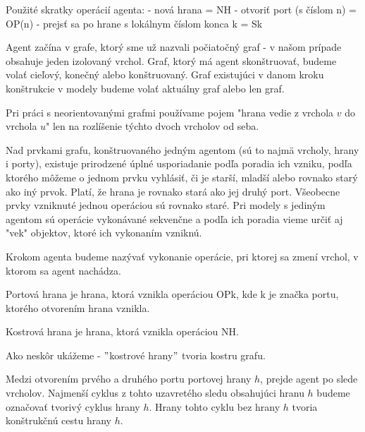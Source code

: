 \begin{ozn}
Použité skratky operácií agenta:
- nová hrana = NH
- otvoriť port (s číslom n) = OP(n)
- prejsť sa po hrane s lokálnym číslom konca k = Sk
\end{ozn}

\begin{ozn}
Agent začína v grafe, ktorý sme už nazvali počiatočný graf - v našom prípade
obsahuje jeden izolovaný vrchol. Graf, ktorý má agent skonštruovať, budeme
volať cieľový, konečný alebo konštruovaný. Graf existujúci v danom kroku
konštrukcie v modely budeme volať aktuálny graf alebo len graf.
\end{ozn}

\begin{pozn}
Pri práci s neorientovanými grafmi používame pojem "hrana vedie z vrchola
$v$
do vrchola $u$" len na rozlíšenie týchto dvoch vrcholov od seba.
\end{pozn}

\begin{ozn}
Nad prvkami grafu, konštruovaného jedným agentom
  (sú to najmä vrcholy, hrany i porty), existuje prirodzené úplné
usporiadanie podľa poradia ich vzniku, podľa ktorého môžeme o jednom prvku
vyhlásiť, či je starší, mladší alebo rovnako starý ako iný prvok. Platí, že
hrana je rovnako stará ako jej druhý port. Všeobecne prvky vzniknuté jednou
operáciou sú rovnako staré. Pri modely s jediným agentom sú operácie
vykonávané sekvenčne a podľa ich poradia vieme určiť aj "vek" objektov,
ktoré ich vykonaním vzniknú.
\end{ozn}

\begin{ozn}
Krokom agenta budeme nazývať vykonanie operácie, pri ktorej sa zmení vrchol,
v ktorom sa agent nachádza.
\end{ozn}

\begin{ozn}
Portová hrana je hrana, ktorá vznikla operáciou OPk, kde k je značka portu,
ktorého otvorením hrana vznikla.
\end{ozn}
\begin{ozn}
Kostrová hrana je hrana, ktorá vznikla operáciou NH.
\end{ozn}
\begin{pozn}
Ako neskôr ukážeme - $"$kostrové hrany$"$ tvoria kostru grafu.
\end{pozn}

\begin{ozn}
Medzi otvorením prvého a druhého portu portovej hrany $h$, prejde agent po slede
vrcholov. Najmenší cyklus z tohto uzavretého sledu obsahujúci
 hranu $h$ budeme označovať tvorivý cyklus hrany $h$. Hrany tohto cyklu bez
hrany $h$ tvoria konštrukčnú cestu hrany $h$.
\end{ozn}

